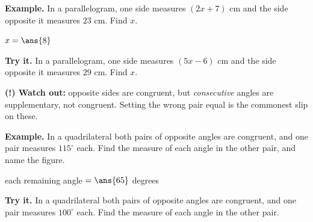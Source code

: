 \documentclass[12pt]{article}
\begin{document}
\begin{examplebox}
\textbf{Example.} In a parallelogram, one side measures $(2x+7)$ cm and the side
opposite it measures $23$ cm. Find $x$.

$x = \ans{8}$
\end{examplebox}

\begin{tryitbox}
\textbf{Try it.} In a parallelogram, one side measures $(5x-6)$ cm and the side
opposite it measures $29$ cm. Find $x$.\\[2pt]
\end{tryitbox}

\begin{watchoutbox}
\textbf{(!) Watch out:} opposite sides are congruent, but \emph{consecutive}
angles are supplementary, not congruent. Setting the wrong pair equal is the
commonest slip on these.
\end{watchoutbox}


\begin{examplebox}
\textbf{Example.} In a quadrilateral both pairs of opposite angles are
congruent, and one pair measures $115^\circ$ each. Find the measure of each
angle in the other pair, and name the figure.

each remaining angle $= \ans{65}$ degrees
\end{examplebox}

\begin{tryitbox}
\textbf{Try it.} In a quadrilateral both pairs of opposite angles are congruent,
and one pair measures $100^\circ$ each. Find the measure of each angle in the
other pair.\\[2pt]
\end{tryitbox}
\end{document}
